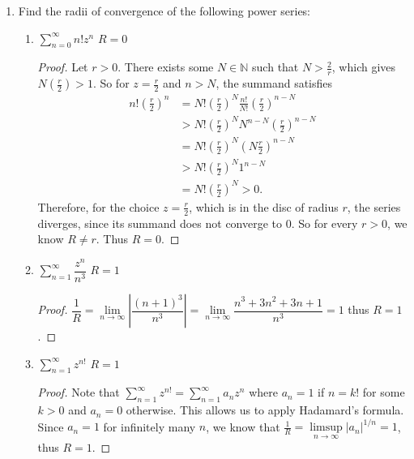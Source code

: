 \documentclass[10pt]{article}
\newcommand{\N}{\mathbb{N}}
\begin{document}
\begin{enumerate}
\item Find the radii of convergence of the following power series:
\\
\begin{enumerate}
\item $\sum_{n=0}^\infty n! z^n$ \hspace{1cm} $R = 0$
\begin{proof}
Let $r > 0$.  There exists some $N \in \N$ such that $N > \frac{2}{r}$, which gives $N (\frac{r}{2}) > 1$.  So for $z = \frac{r}{2}$ and $n > N$, the summand satisfies
\begin{align*}
n! \left( \frac{r}{2} \right)^n
&=
N! \left( \frac{r}{2} \right)^N \frac{n!}{N!} \left( \frac{r}{2} \right)^{n-N}
\\
&>
N! \left( \frac{r}{2} \right)^N N^{n-N} \left( \frac{r}{2} \right)^{n-N}
\\
&=
N! \left( \frac{r}{2} \right)^N \left( N \frac{r}{2} \right)^{n-N}
\\
&>
N! \left( \frac{r}{2} \right)^N 1^{n-N}
\\
&=
N! \left( \frac{r}{2} \right)^N > 0.
\end{align*}
Therefore, for the choice $z = \frac{r}{2}$, which is in the disc of radius $r$, the series diverges, since its summand does not converge to $0$.  So for every $r > 0$, we know $R \neq r$.  Thus $R = 0$.
\end{proof}

\item $\sum_{n=1}^\infty \dfrac{z^n}{n^3}$ \hspace{1cm} $R = 1$
\begin{proof}
$\dfrac1R = \lim\limits_{n \rightarrow \infty} \left| \dfrac{(n+1)^3}{n^3} \right| = \lim\limits_{n \rightarrow \infty} \dfrac{n^3 + 3n^2 + 3n + 1}{n^3} = 1$ thus $R = 1$.
\end{proof}

\item $\sum_{n=1}^\infty z^{n!}$ \hspace{1cm} $R = 1$

\begin{proof}
Note that $\sum_{n=1}^\infty z^{n!} = \sum_{n=1}^\infty a_n z^{n}$ where $a_n = 1$ if $n = k!$ for some $k>0$ and $a_n = 0$ otherwise.  This allows us to apply Hadamard's formula.  Since $a_n = 1$ for infinitely many $n$, we know that $\frac{1}{R} = \limsup\limits_{n \rightarrow \infty} |a_n|^{1/n} = 1$, thus $R = 1$.
\end{proof}


\end{enumerate}
\end{enumerate}
\end{document}
